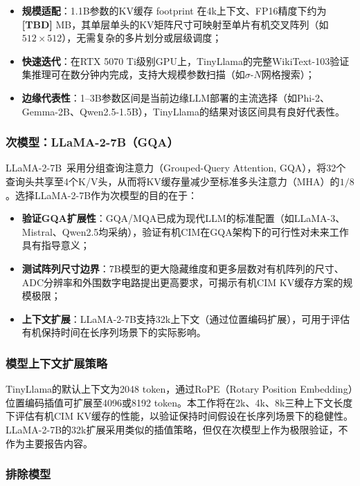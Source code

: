 \begin{itemize}
    \item \textbf{规模适配}：1.1B参数的KV缓存 footprint 在4k上下文、FP16精度下约为\textbf{[TBD]} MB，其单层单头的KV矩阵尺寸可映射至单片有机交叉阵列（如$512 \times 512$），无需复杂的多片划分或层级调度；
    \item \textbf{快速迭代}：在RTX 5070 Ti级别GPU上，TinyLlama的完整WikiText-103验证集推理可在数分钟内完成，支持大规模参数扫描（如$\sigma$-$N$网格搜索）；
    \item \textbf{边缘代表性}：1–3B参数区间是当前边缘LLM部署的主流选择（如Phi-2、Gemma-2B、Qwen2.5-1.5B），TinyLlama的结果对该区间具有良好代表性。
\end{itemize}

\subsubsection{次模型：LLaMA-2-7B（GQA）}

LLaMA-2-7B~\cite{touvron2023llama2}采用分组查询注意力（Grouped-Query Attention, GQA），将32个查询头共享至4个K/V头，从而将KV缓存量减少至标准多头注意力（MHA）的$1/8$。选择LLaMA-2-7B作为次模型的目的在于：

\begin{itemize}
    \item \textbf{验证GQA扩展性}：GQA/MQA已成为现代LLM的标准配置（如LLaMA-3、Mistral、Qwen2.5均采纳），验证有机CIM在GQA架构下的可行性对未来工作具有指导意义；
    \item \textbf{测试阵列尺寸边界}：7B模型的更大隐藏维度和更多层数对有机阵列的尺寸、ADC分辨率和外围数字电路提出更高要求，可揭示有机CIM KV缓存方案的规模极限；
    \item \textbf{上下文扩展}：LLaMA-2-7B支持32k上下文（通过位置编码扩展），可用于评估有机保持时间在长序列场景下的实际影响。
\end{itemize}

\subsubsection{模型上下文扩展策略}

TinyLlama的默认上下文为2048 token，通过RoPE（Rotary Position Embedding）位置编码插值可扩展至4096或8192 token。本工作将在2k、4k、8k三种上下文长度下评估有机CIM KV缓存的性能，以验证保持时间假设在长序列场景下的稳健性。LLaMA-2-7B的32k扩展采用类似的插值策略，但仅在次模型上作为极限验证，不作为主要报告内容。

\subsubsection{排除模型}

